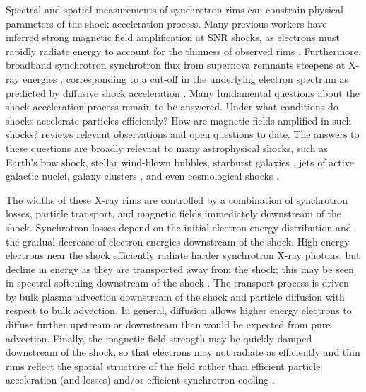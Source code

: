 \documentclass[iop, apj, numberedappendix]{emulateapj}
\begin{document}
Spectral and spatial measurements of synchrotron rims can constrain physical
parameters of the shock acceleration process.  Many previous workers have
inferred strong magnetic field amplification at SNR shocks, as electrons must
rapidly radiate energy to account for the thinness of observed rims
\citep{bamba2003, vink2003, parizot2006}.  Furthermore, broadband synchrotron
synchrotron flux from supernova remnants steepens at X-ray energies
\citep{reynolds1999}, corresponding to a cut-off in the underlying electron
spectrum as predicted by diffusive shock acceleration \citep{webb1984}.  Many
fundamental questions about the shock acceleration process remain to be
answered.  Under what conditions do shocks accelerate particles efficiently?
How are magnetic fields amplified in such shocks?  \citet{reynolds2008} reviews
relevant observations and open questions to date.  The answers to these
questions are broadly relevant to many astrophysical shocks, such as Earth's
bow shock, stellar wind-blown bubbles, starburst galaxies \citep{heckman1990},
jets of active galactic nuclei, galaxy clusters \citep{van-weeren2010}, and
even cosmological shocks \citep{ryu2008}.

The widths of these X-ray rims are controlled by a combination of
synchrotron losses, particle transport, and magnetic fields immediately
downstream of the shock.  Synchrotron losses depend on the initial electron
energy distribution and the gradual decrease of electron energies downstream of
the shock.  High energy electrons near the shock efficiently radiate harder
synchrotron X-ray photons, but decline in energy as they are transported away
from the shock; this may be seen in spectral softening downstream of the shock
\citep[e.g.,][]{cassam-chenai2007}.  The transport process is driven by bulk
plasma advection downstream of the shock and particle diffusion with respect to
bulk advection.  In general, diffusion allows higher energy electrons to
diffuse further upstream or downstream than would be expected from pure
advection.  Finally, the magnetic field strength may be quickly damped
downstream of the shock, so that electrons may not radiate as efficiently and
thin rims reflect the spatial structure of the field rather than efficient
particle acceleration (and losses) and/or efficient synchrotron cooling
\citep{pohl2005}.
\end{document}
